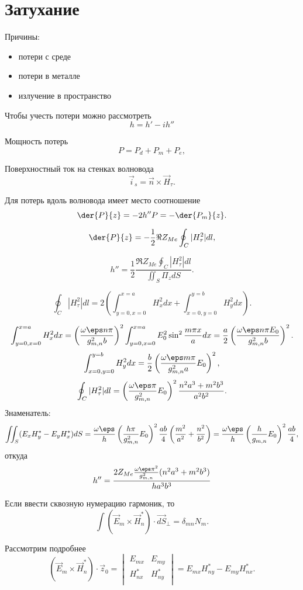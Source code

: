 \section{Затухание}
Причины:
\begin{itemize}
	\item потери с среде
	\item потери в металле
	\item излучение в пространство
\end{itemize}

Чтобы учесть потери можно рассмотреть
\[
	h = h' - ih''
\]

Мощность потерь
\[
	P = P_d + P_m + P_e,
\]

Поверхностный ток на стенках волновода
\[
	\vec{i}_s = \vec{n}\times\vec{H}_\tau.
\]

Для потерь вдоль волновода имеет место соотношение
\[
	\der{P}{z} = -2h''P = -\der{P_m}{z}.
\]

\[
	\der{P}{z} = -\frac{1}{2}\Re Z_{Me}\oint_C |H_\tau^2| dl,
\]

\[
	h'' = \frac{1}{2}\frac{\Re Z_{Me}\oint_C |H_\tau^2| dl}{\iint_S \Pi_z dS}.
\]

\[
	\oint_C |H_\tau^2| dl = 2 \left( \int_{y=0, x=0}^{x=a} H_x^2 dx +
	\int_{x=0, y=0}^{y=b} H_y^2 dx  \right).
\]

\[
\int_{y=0, x=0}^{x=a} H_x^2 dx = \left(\frac{\omega\eps n\pi}{g_{m,n}^2b}\right)^2\int_{y=0, x=0}^{x=a} E_0^2\sin^2\frac{m\pi x}{a} dx = \frac{a}{2}\left(\frac{\omega\eps n\pi E_0}{g_{m,n}^2b}\right)^2.
\]
\[
	\int_{x=0, y=0}^{y=b} H_y^2 dx = \frac{b}{2}\left(
	\frac{\omega\eps m\pi}{g_{m,n}^2a}E_0\right)^2,
\]
\[
	\oint_C |H_\tau^2| dl =\left(\frac{\omega\eps \pi}{g_{m,n}^2}E_0\right)^2 \frac{n^2a^3 + m^2b^3}{a^2b^2}.
\]
Знаменатель:
\[
	\iint_S (E_xH_y^* - E_yH_x^*) dS = \frac{\omega\eps}{h}
	\left(\frac{h\pi}{g_{m,n}^2}E_0\right)^2\frac{ab}{4}
	\left(\frac{m^2}{a^2}+\frac{n^2}{b^2}\right) =
	\frac{\omega\eps}{h}
	\left(\frac{h}{g_{m,n}}E_0\right)^2\frac{ab}{4},
\]
откуда
\[
	h'' = \frac{2Z_{Me}\frac{\omega\eps \pi^2}{g_{m,n}^2} (n^2a^3 + m^2b^3)}{ha^3b^3}
\]

Если ввести сквозную нумерацию гармоник, то
\[
	\int (\vec{E}_m\times\vec{H}_n^*)\cdot\vec{dS}_\perp = \delta_{mn}N_m.
\]

Рассмотрим подробнее
\[
	(\vec{E}_m\times\vec{H}_n^*)\cdot\vec{z}_0 =
	\begin{vmatrix}
		E_{mx} & E_{my}\\
		H_{nx}^* & H_{ny}^*\\
	\end{vmatrix}
	=
	E_{mx}H_{ny}^* - E_{my}H_{nx}^*.
\]


